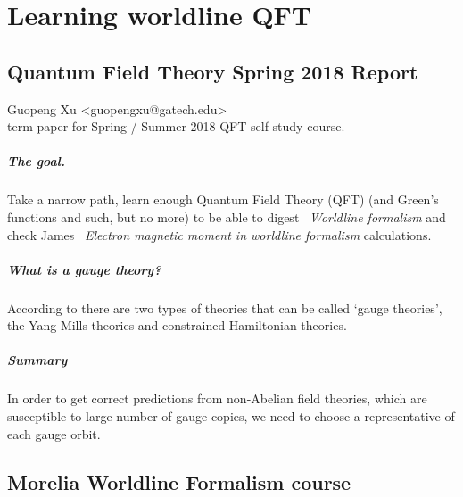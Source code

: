 
\chapter{Learning worldline QFT}
\section{Quantum Field Theory Spring 2018 Report}

\noindent
Guopeng Xu <guopengxu@gatech.edu> \\
term paper for Spring / Summer 2018 QFT self-study course.


\paragraph{The goal.}
    Take a narrow path, learn enough Quantum Field Theory (QFT) (and
    Green's functions and such, but no more) to be able to digest
    ~{\em Worldline formalism} and check James
    ~{\em Electron magnetic moment in
    worldline formalism} calculations.

 \paragraph{What is a gauge theory?}
According to there are two types of theories
that can be called \lq gauge theories\rq, the Yang-Mills theories and
constrained Hamiltonian theories.

\paragraph{Summary}
In order to get correct predictions from non-Abelian field theories,
which are susceptible to large number of gauge copies, we need to choose
a representative of each gauge orbit.

\section{Morelia Worldline Formalism course}
\label{c-MoreliaCourse}

